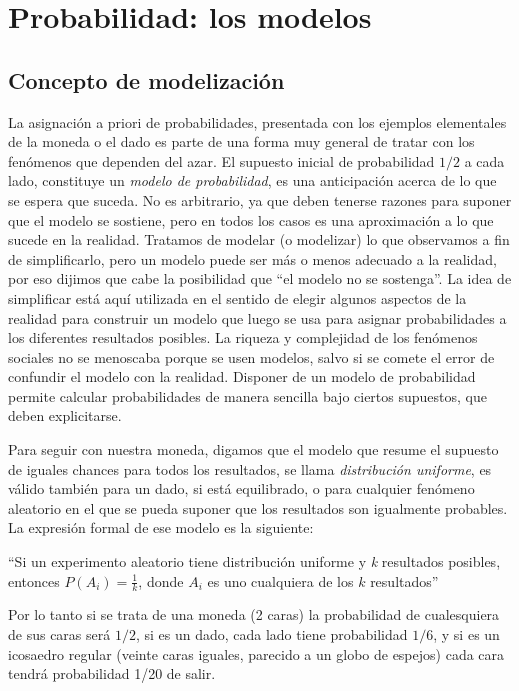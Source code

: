 \documentclass[]{article}
\title{}
\author{}
\date{}
\begin{document}
\hypertarget{probabilidad-los-modelos}{%
\section{Probabilidad: los modelos}\label{probabilidad-los-modelos}}

\hypertarget{concepto-de-modelizaciuxf3n}{%
\subsection{Concepto de
modelización}\label{concepto-de-modelizaciuxf3n}}

La asignación a priori de probabilidades, presentada con los ejemplos
elementales de la moneda o el dado es parte de una forma muy general de
tratar con los fenómenos que dependen del azar. El supuesto inicial de
probabilidad \(1/2\) a cada lado, constituye un \emph{modelo de
probabilidad}, es una anticipación acerca de lo que se espera que
suceda. No es arbitrario, ya que deben tenerse razones para suponer que
el modelo se sostiene, pero en todos los casos es una aproximación a lo
que sucede en la realidad. Tratamos de modelar (o modelizar) lo que
observamos a fin de simplificarlo, pero un modelo puede ser más o menos
adecuado a la realidad, por eso dijimos que cabe la posibilidad que ``el
modelo no se sostenga''. La idea de simplificar está aquí utilizada en
el sentido de elegir algunos aspectos de la realidad para construir un
modelo que luego se usa para asignar probabilidades a los diferentes
resultados posibles. La riqueza y complejidad de los fenómenos sociales
no se menoscaba porque se usen modelos, salvo si se comete el error de
confundir el modelo con la realidad. Disponer de un modelo de
probabilidad permite calcular probabilidades de manera sencilla bajo
ciertos supuestos, que deben explicitarse.

Para seguir con nuestra moneda, digamos que el modelo que resume el
supuesto de iguales chances para todos los resultados, se llama
\emph{distribución uniforme}, es válido también para un dado, si está
equilibrado, o para cualquier fenómeno aleatorio en el que se pueda
suponer que los resultados son igualmente probables. La expresión formal
de ese modelo es la siguiente:

``Si un experimento aleatorio tiene distribución uniforme y \emph{k}
resultados posibles, entonces \(P(A_{i}) = \frac{1}{k}\), donde
\(A_{i}\) es uno cualquiera de los \(k\) resultados''

Por lo tanto si se trata de una moneda (2 caras) la probabilidad de
cualesquiera de sus caras será \(1/2\), si es un dado, cada lado tiene
probabilidad \(1/6\), y si es un icosaedro regular (veinte caras
iguales, parecido a un globo de espejos) cada cara tendrá probabilidad
1/20 de salir.
\end{document}
